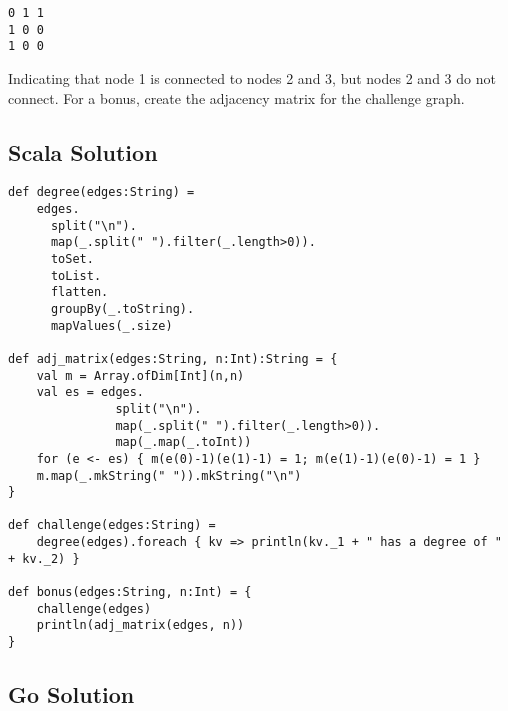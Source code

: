 \begin{verbatim}
0 1 1
1 0 0
1 0 0
\end{verbatim}

Indicating that node 1 is connected to nodes 2 and 3, but nodes 2 and 3
do not connect. For a bonus, create the adjacency matrix for the
challenge graph.

\subsection{Scala Solution}\label{scala-solution-16}

\begin{verbatim}
def degree(edges:String) = 
    edges.
      split("\n").
      map(_.split(" ").filter(_.length>0)).
      toSet.
      toList.
      flatten.
      groupBy(_.toString).
      mapValues(_.size)

def adj_matrix(edges:String, n:Int):String = {
    val m = Array.ofDim[Int](n,n)
    val es = edges.
               split("\n").
               map(_.split(" ").filter(_.length>0)).
               map(_.map(_.toInt))
    for (e <- es) { m(e(0)-1)(e(1)-1) = 1; m(e(1)-1)(e(0)-1) = 1 }
    m.map(_.mkString(" ")).mkString("\n")
}

def challenge(edges:String) = 
    degree(edges).foreach { kv => println(kv._1 + " has a degree of " + kv._2) }

def bonus(edges:String, n:Int) = {
    challenge(edges)
    println(adj_matrix(edges, n))
}
\end{verbatim}

\subsection{Go Solution}\label{go-solution-1}

